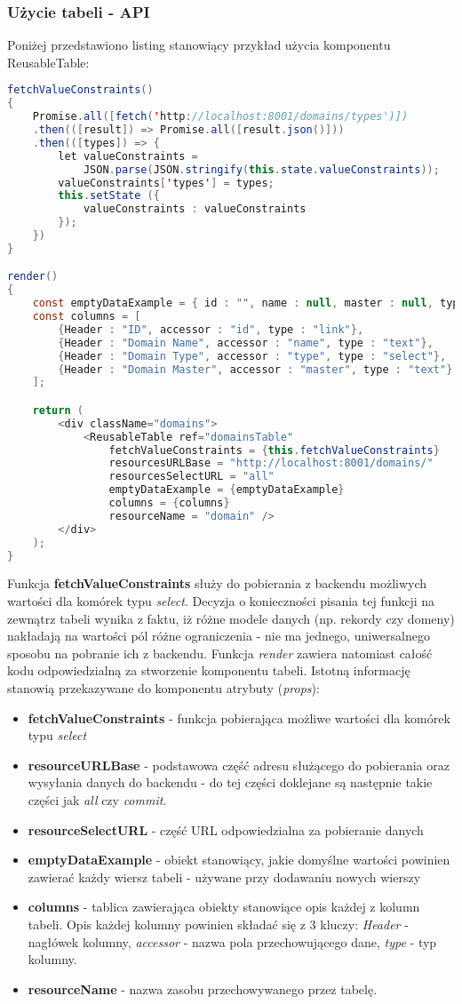 \documentclass[11pt]{article}
\begin{document}
\subsubsection{Użycie tabeli - API}
Poniżej przedstawiono listing stanowiący przykład użycia komponentu ReusableTable:
\begin{lstlisting}[language=java, tabsize=2]
fetchValueConstraints()
{
	Promise.all([fetch('http://localhost:8001/domains/types')])
	.then(([result]) => Promise.all([result.json()]))
	.then(([types]) => {
		let valueConstraints = 
			JSON.parse(JSON.stringify(this.state.valueConstraints));
		valueConstraints['types'] = types;
		this.setState ({
			valueConstraints : valueConstraints
		});
	})
}

render()
{
	const emptyDataExample = { id : "", name : null, master : null, type : null};
	const columns = [
		{Header : "ID", accessor : "id", type : "link"},
		{Header : "Domain Name", accessor : "name", type : "text"},
		{Header : "Domain Type", accessor : "type", type : "select"},
		{Header : "Domain Master", accessor : "master", type : "text"}
	];

	return (
		<div className="domains">
			<ReusableTable ref="domainsTable"
				fetchValueConstraints = {this.fetchValueConstraints}
				resourcesURLBase = "http://localhost:8001/domains/"
				resourcesSelectURL = "all"
				emptyDataExample = {emptyDataExample}
				columns = {columns}
				resourceName = "domain" />
		</div>
	);
}
\end{lstlisting}
Funkcja \textbf{fetchValueConstraints} służy do pobierania z backendu możliwych wartości dla komórek typu \emph{select}. Decyzja o konieczności pisania tej funkcji na zewnątrz tabeli wynika z faktu, iż różne modele danych (np. rekordy czy domeny) nakładają na wartości pól różne ograniczenia - nie ma jednego, uniwersalnego sposobu na pobranie ich z backendu. Funkcja \emph{render} zawiera natomiast całość kodu odpowiedzialną za stworzenie komponentu tabeli. Istotną informację stanowią przekazywane do komponentu atrybuty (\emph{props}):
\begin{itemize}
\item \textbf{fetchValueConstraints} - funkcja pobierająca możliwe wartości dla komórek typu \emph{select} 
\item \textbf{resourceURLBase} - podstawowa część adresu służącego do pobierania oraz wysyłania danych do backendu - do tej części doklejane są następnie takie części jak \emph{all} czy \emph{commit}.
\item \textbf{resourceSelectURL} - część URL odpowiedzialna za pobieranie danych
\item \textbf{emptyDataExample} - obiekt stanowiący, jakie domyślne wartości powinien zawierać każdy wiersz tabeli - używane przy dodawaniu nowych wierszy
\item \textbf{columns} - tablica zawierająca obiekty stanowiące opis każdej z kolumn tabeli. Opis każdej kolumny powinien składać się z 3 kluczy: \emph{Header} - nagłówek kolumny, \emph{accessor} - nazwa pola przechowującego dane, \emph{type} - typ kolumny.
\item \textbf{resourceName} - nazwa zasobu przechowywanego przez tabelę.
\end{itemize}
\end{document}
